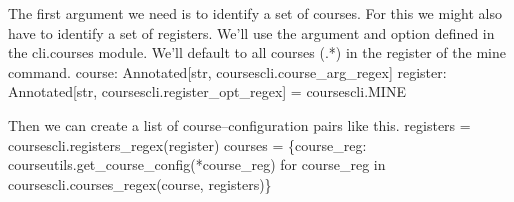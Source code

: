 The first argument we need is to identify a set of courses.
For this we might also have to identify a set of registers.
We'll use the argument and option defined in the {\Tt{}cli.courses\nwendquote} module.
We'll default to all courses ({\Tt{}.*\nwendquote}) in the register of the {\Tt{}mine\nwendquote} command.
\nwenddocs{}\endmoddef\nwstartdeflinemarkup{}\nwenddeflinemarkup
course: Annotated[str, coursescli.course_arg_regex]
\nwendcode{}\endmoddef\nwstartdeflinemarkup{}\nwenddeflinemarkup
register: Annotated[str, coursescli.register_opt_regex] = coursescli.MINE
\nwendcode{}\nwdocspar

Then we can create a list of course--configuration pairs like this.
\nwenddocs{}\endmoddef\nwstartdeflinemarkup{}\nwenddeflinemarkup
registers = coursescli.registers_regex(register)
courses = \{course_reg: courseutils.get_course_config(*course_reg)
           for course_reg in coursescli.courses_regex(course, registers)\}
\nwendcode{}\nwdocspar


